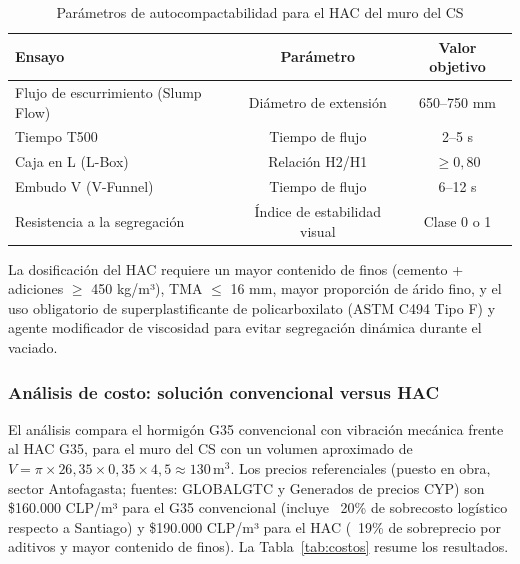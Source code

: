 \begin{table}[H]
  \centering
  \caption{Parámetros de autocompactabilidad para el HAC del muro del CS}
  \label{tab:hac}
  \begin{tabular}{lcc}
    \toprule
    Ensayo                     & Parámetro         & Valor objetivo \\
    \midrule
    Flujo de escurrimiento (Slump Flow) & Diámetro de extensión      & 650--750 mm             \\
    Tiempo T500                         & Tiempo de flujo            & 2--5 s                  \\
    Caja en L (L-Box)                   & Relación H2/H1             & $\geq 0{,}80$           \\
    Embudo V (V-Funnel)                 & Tiempo de flujo            & 6--12 s                 \\
    Resistencia a la segregación        & Índice de estabilidad visual & Clase 0 o 1            \\
    \bottomrule
  \end{tabular}
\end{table}

La dosificación del HAC requiere un mayor contenido de finos (cemento + adiciones $\geq$ 450 kg/m³), TMA $\leq$ 16 mm, mayor proporción de árido fino, y el uso obligatorio de superplastificante de policarboxilato (ASTM C494 Tipo F) y agente modificador de viscosidad para evitar segregación dinámica durante el vaciado.

\subsubsection{Análisis de costo: solución convencional versus HAC}

El análisis compara el hormigón G35 convencional con vibración mecánica frente al HAC G35, para el muro del CS con un volumen aproximado de $V = \pi \times 26{,}35 \times 0{,}35 \times 4{,}5 \approx 130\,\text{m}^3$. Los precios referenciales (puesto en obra, sector Antofagasta; fuentes: GLOBALGTC y Generados de precios CYP) son \$160.000 CLP/m³ para el G35 convencional (incluye ~20\% de sobrecosto logístico respecto a Santiago) y \$190.000 CLP/m³ para el HAC (~19\% de sobreprecio por aditivos y mayor contenido de finos). La Tabla~\ref{tab:costos} resume los resultados.

